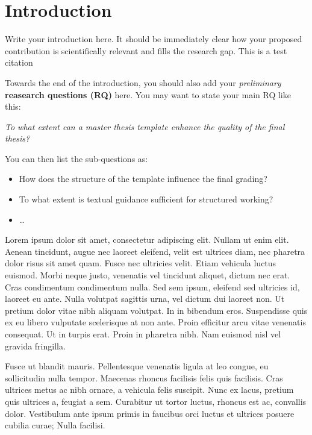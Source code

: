 \section{Introduction}
\label{sec:introduction}
Write your introduction here. It should be immediately clear how your proposed contribution is scientifically relevant and fills the research gap. This is a test citation \cite{Gruber1995}

Towards the end of the introduction, you should also add your \textit{preliminary} \textbf{reasearch questions (RQ)} here. You may want to state your main RQ like this:

\noindent\textit{To what extent can a master thesis template enhance the quality of the final thesis?}

You can then list the sub-questions as:
\begin{itemize}
    \item How does the structure of the template influence the final grading?
    \item To what extent is textual guidance sufficient for structured working?
    \item \dots
\end{itemize}

Lorem ipsum dolor sit amet, consectetur adipiscing elit. Nullam ut enim elit. Aenean tincidunt, augue nec laoreet eleifend, velit est ultrices diam, nec pharetra dolor risus sit amet quam. Fusce nec ultricies velit. Etiam vehicula luctus euismod. Morbi neque justo, venenatis vel tincidunt aliquet, dictum nec erat. Cras condimentum condimentum nulla. Sed sem ipsum, eleifend sed ultricies id, laoreet eu ante. Nulla volutpat sagittis urna, vel dictum dui laoreet non. Ut pretium dolor vitae nibh aliquam volutpat. In in bibendum eros. Suspendisse quis ex eu libero vulputate scelerisque at non ante. Proin efficitur arcu vitae venenatis consequat. Ut in turpis erat. Proin in pharetra nibh. Nam euismod nisl vel gravida fringilla.

Fusce ut blandit mauris. Pellentesque venenatis ligula at leo congue, eu sollicitudin nulla tempor. Maecenas rhoncus facilisis felis quis facilisis. Cras ultrices metus ac nibh ornare, a vehicula felis suscipit. Nunc ex lacus, pretium quis ultrices a, feugiat a sem. Curabitur ut tortor luctus, rhoncus est ac, convallis dolor. Vestibulum ante ipsum primis in faucibus orci luctus et ultrices posuere cubilia curae; Nulla facilisi.

